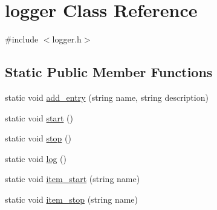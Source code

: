 \hypertarget{classlogger}{}\section{logger Class Reference}
\label{classlogger}


{\ttfamily \#include $<$logger.\+h$>$}

\subsection*{Static Public Member Functions}
\begin{DoxyCompactItemize}
\item 
static void \hyperlink{classlogger_a710163deb17bc81f70d53d285b8ac9ac}{add\+\_\+entry} (string name, string description)
\item 
static void \hyperlink{classlogger_afba86118a3bb044060be8309b3fa755a}{start} ()
\item 
static void \hyperlink{classlogger_abb856642f4e62c7a4a11cc4a2d963010}{stop} ()
\item 
static void \hyperlink{classlogger_ab518e6d927694bb7329e933fa75c27bf}{log} ()
\item 
static void \hyperlink{classlogger_a7e21ec6ad2d40cfc2c6a383521b5641a}{item\+\_\+start} (string name)
\item 
static void \hyperlink{classlogger_a6775fee9681c437fc9c05d71cfbbe4a2}{item\+\_\+stop} (string name)
\end{DoxyCompactItemize}
